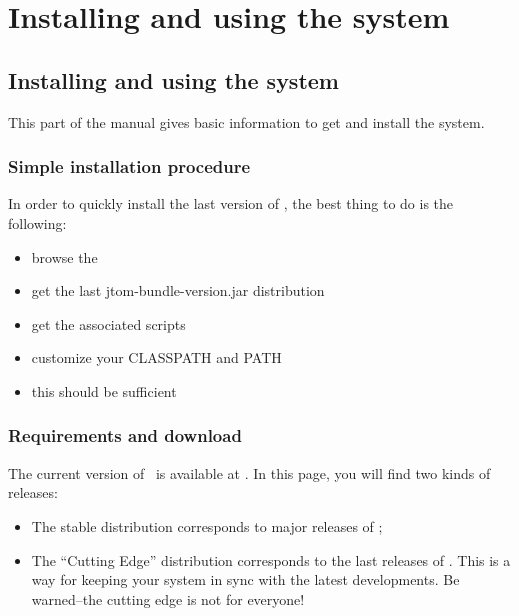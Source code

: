 \part{Installing and using the system}
\chapter{Installing and using the system}
This part of the manual gives basic information to get and install the
system.

\section{Simple installation procedure}
In order to quickly install the last version of \TOM, the best thing
to do is the following:
{\bf
\begin{itemize}
\item browse the 
\item get the last jtom-bundle-version.jar distribution
\item get the associated scripts
\item customize your CLASSPATH and PATH
\item this should be sufficient
\end{itemize}
}

\section{Requirements and download}
The current version of \TOM\ is available at .
In this page, you will find two kinds of releases:

\begin{itemize}
\item The stable distribution corresponds to major releases of \TOM;
\item The ``Cutting Edge'' distribution corresponds to the last
  releases of \TOM. This is a way for keeping your system in sync with
  the latest developments. Be warned--the cutting edge is not for
  everyone! 
\end{itemize}

